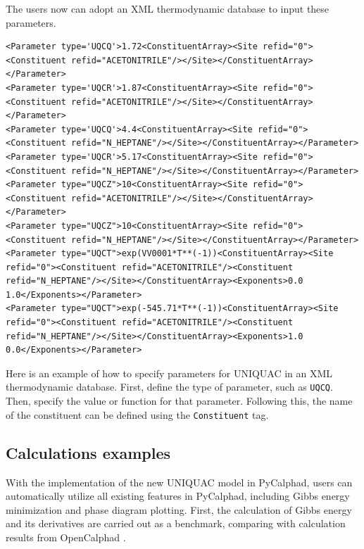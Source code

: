 The users now can adopt an XML thermodynamic database to input these parameters.
\begin{verbatim}
<Parameter type='UQCQ'>1.72<ConstituentArray><Site refid="0"><Constituent refid="ACETONITRILE"/></Site></ConstituentArray></Parameter>
<Parameter type='UQCR'>1.87<ConstituentArray><Site refid="0"><Constituent refid="ACETONITRILE"/></Site></ConstituentArray></Parameter>
<Parameter type='UQCQ'>4.4<ConstituentArray><Site refid="0"><Constituent refid="N_HEPTANE"/></Site></ConstituentArray></Parameter>
<Parameter type='UQCR'>5.17<ConstituentArray><Site refid="0"><Constituent refid="N_HEPTANE"/></Site></ConstituentArray></Parameter>
<Parameter type="UQCZ">10<ConstituentArray><Site refid="0"><Constituent refid="ACETONITRILE"/></Site></ConstituentArray></Parameter>
<Parameter type="UQCZ">10<ConstituentArray><Site refid="0"><Constituent refid="N_HEPTANE"/></Site></ConstituentArray></Parameter>
<Parameter type="UQCT">exp(VV0001*T**(-1))<ConstituentArray><Site refid="0"><Constituent refid="ACETONITRILE"/><Constituent refid="N_HEPTANE"/></Site></ConstituentArray><Exponents>0.0 1.0</Exponents></Parameter>
<Parameter type="UQCT">exp(-545.71*T**(-1))<ConstituentArray><Site refid="0"><Constituent refid="ACETONITRILE"/><Constituent refid="N_HEPTANE"/></Site></ConstituentArray><Exponents>1.0 0.0</Exponents></Parameter>
\end{verbatim}

Here is an example of how to specify parameters for UNIQUAC in an XML thermodynamic database. First, define the type of parameter, such as \texttt{UQCQ}. Then, specify the value or function for that parameter. Following this, the name of the constituent can be defined using the \texttt{Constituent} tag.

\subsection{Calculations examples} \label{models:ssec:UNIQUACexamples}
With the implementation of the new UNIQUAC model in PyCalphad, users can automatically utilize all existing features in PyCalphad, including Gibbs energy minimization and phase diagram plotting. First, the calculation of Gibbs energy and its derivatives are carried out as a benchmark, comparing with calculation results from OpenCalphad \cite{li2020implementation}.

